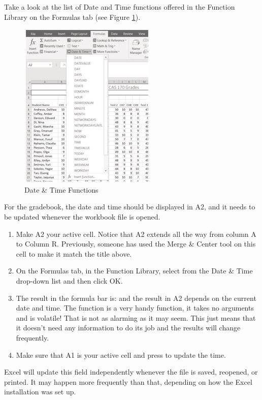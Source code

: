 Take a look at the list of Date and Time functions offered in the Function Library on the Formulas tab (see Figure \ref{03:fig16}).

\begin{figure}[H]
	\centering
	\includegraphics[width=\maxwidth{.95\linewidth}]{gfx/ch03_fig16}
	\caption{Date \& Time Functions}
	\label{03:fig16}
\end{figure}

For the gradebook, the date and time should be displayed in \textsf{A2}, and it needs to be updated whenever the workbook file is opened.

\begin{enumerate}
	\item Make \textsf{A2} your active cell. Notice that \textsf{A2} extends all the way from column A to Column R. Previously, someone has used the Merge \& Center tool on this cell to make it match the title above.
	\item On the Formulas tab, in the Function Library, select  from the Date \& Time drop-down list and then click OK.
	\item The result in the formula bar is:  and the result in \textsf{A2} depends on the current date and time. The  function is a very handy function, it takes no arguments and is volatile! That is not as alarming as it may seem. This just means that it doesn't need any information to do its job and the results will change frequently. 
	\item Make sure that \textsf{A1} is your active cell and press   to update the time.
\end{enumerate}

Excel will update this field independently whenever the file is saved, reopened, or printed. It may happen more frequently than that, depending on how the Excel installation was set up.

